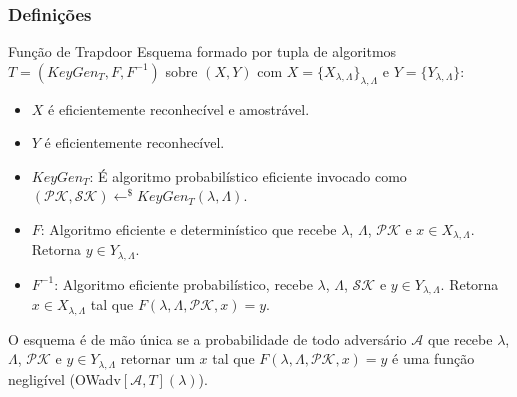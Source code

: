 \documentclass{beamer}
\begin{document}
\begin{frame}
    \frametitle{Definições}
    \begin{block}{Função de Trapdoor}
    Esquema formado por tupla de algoritmos $T=(KeyGen_T, F, F^{-1})$
    sobre  $(X, Y)$ com $X=\{X_{\lambda,\Lambda}\}_{\lambda, \Lambda}$ e $Y=\{Y_{\lambda, \Lambda}\}$:
    \begin{itemize}
        \item $X$ é eficientemente reconhecível e amostrável. 
        \item $Y$ é eficientemente reconhecível. 
        \item $KeyGen_T$: É algoritmo probabilístico eficiente invocado como  $(\mathcal{PK}, \mathcal{SK})\leftarrow^{\$}KeyGen_T(\lambda, \Lambda)$.
        \item $F$: Algoritmo eficiente e determinístico que recebe $\lambda$, $\Lambda$, $\mathcal{PK}$ e $x \in X_{\lambda,\Lambda}$. Retorna $y \in Y_{\lambda,\Lambda}$.
        \item $F^{-1}$: Algoritmo eficiente probabilístico, recebe $\lambda$, $\Lambda$, $\mathcal{SK}$ e $y \in Y_{\lambda,\Lambda}$. Retorna $x \in X_{\lambda,\Lambda}$ tal que $F(\lambda, \Lambda, \mathcal{PK}, x)=y$.
    \end{itemize}
    O esquema é de mão única se a probabilidade de todo adversário $\mathcal{A}$ que recebe $\lambda$, $\Lambda$, $\mathcal{PK}$ e $y \in Y_{\lambda,\Lambda}$ retornar um $x$ tal que $F(\lambda,\Lambda,\mathcal{PK}, x) = y$ é uma função negligível (OWadv$[\mathcal{A},T](\lambda)$). 
    \end{block}
\end{frame}
\end{document}
